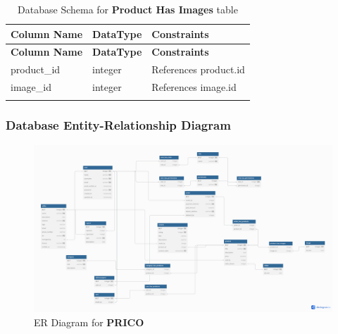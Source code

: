 \documentclass[12pt]{report}
\begin{document}
\begin{longtable}[H]{|l|l|p{6.5cm}||}
	\hline
	\textbf{Column Name} & \textbf{DataType} & \textbf{Constraints}  \\
	\hline
	\endfirsthead
	\hline
	\textbf{Column Name} & \textbf{DataType} & \textbf{Constraints}  \\
	\hline
	\endhead
	product\_id          & integer           & References product.id \\
	\hline
	image\_id            & integer           & References image.id   \\
	\hline
	\hline
	\caption{Database Schema for \textbf{Product Has Images} table}\label{tab:tableProductHasImages}
\end{longtable}

\subsubsection{Database Entity-Relationship Diagram}

\begin{figure}[H]
	\begin{center}
		\includegraphics[width=1\textwidth]{diagrams/er}
	\end{center}
	\caption{ER Diagram for \textbf{PRICO}}
\end{figure}

\newpage

\nocite{*}


\end{document}
